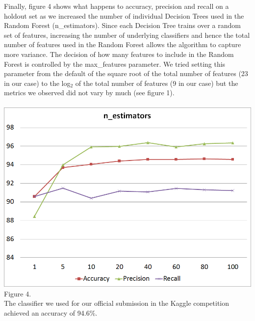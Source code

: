 \documentclass[twoside,11pt]{homework}
\begin{document}
Finally, figure 4 shows what happens to accuracy, precision and recall on a holdout set as we increased the 
number of individual Decision Trees used in the Random Forest (n\_estimators). Since each Decision Tree trains
over a random set of features, increasing the number of underlying classifiers and hence the total number of features
used in the Random Forest allows the algorithm to capture more variance. The decision of how many features to include
in the Random Forest is controlled by the max\_features parameter. We tried setting this parameter from the default of the square
root of the total number of features (23 in our case) to the log$_2$ of the total number of features (9 in our case)
but the metrics we observed did not vary by much (see figure 1). 
\\
\\
\includegraphics[scale=0.5]{n_estimators.png}
\\
Figure 4.
\\


The classifier we used for our official submission in the Kaggle competition achieved an accuracy of 94.6\%.
\end{document}
